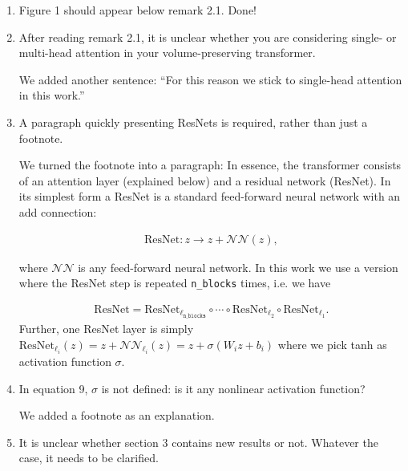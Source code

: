 \documentclass{article}
\begin{document}
\begin{enumerate}
\item Figure 1 should appear below remark 2.1.
    {\color{mred} Done!}
\item After reading remark 2.1, it is unclear whether you are considering single- or multi-head attention in your volume-preserving transformer.

    {\color{mred} We added another sentence: ``For this reason we stick to single-head attention in this work.''}
\item A paragraph quickly presenting ResNets is required, rather than just a footnote.

    {\color{mred} We turned the footnote into a paragraph:
    In essence, the transformer consists of an attention layer (explained below) and a residual network (ResNet). In its simplest form a ResNet is a standard feed-forward neural network with an add connection:

    \begin{equation}
    \begin{split}\mathrm{ResNet}: z \rightarrow z + \mathcal{NN}(z),\end{split}\end{equation}

    where \(\mathcal{NN}\) is any feed-forward neural network. In this work we use a version where the ResNet step is repeated \texttt{n\_blocks} times, i.e. we have

    \begin{equation}
    \begin{split}    \mathrm{ResNet} = \mathrm{ResNet}_{\ell_\mathtt{n\_blocks}}\circ\cdots\circ\mathrm{ResNet}_{\ell_2}\circ\mathrm{ResNet}_{\ell_1}.\end{split}\end{equation}
    Further, one ResNet layer is simply \(\mathrm{ResNet}_{\ell_i}(z) = z + \mathcal{NN}_{\ell_i}(z) = z + \sigma(W_iz + b_i)\) where we pick tanh as activation function \(\sigma.\) }

\item In equation 9, $\sigma$ is not defined: is it any nonlinear activation function?

        {\color{mred} We added a footnote as an explanation.}
\item It is unclear whether section 3 contains new results or not. Whatever the case, it needs to be clarified.


\end{enumerate}
\end{document}

